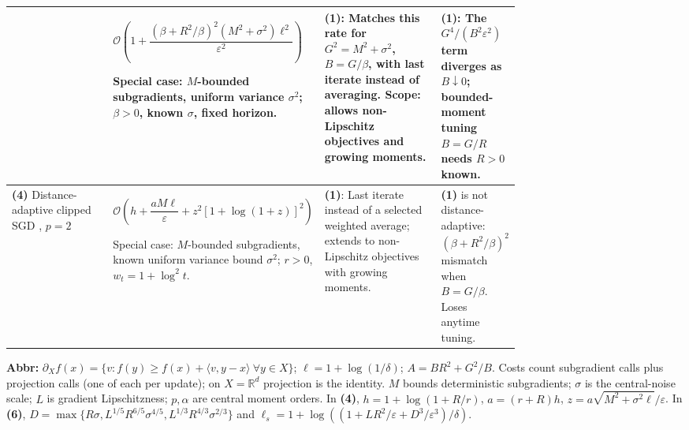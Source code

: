 \begin{table}[tp]
\begin{threeparttable}
\begin{tabularx}{\linewidth}{@{}>{\raggedright\arraybackslash}p{0.20\linewidth}>{\raggedright\arraybackslash}p{0.32\linewidth}>{\raggedright\arraybackslash}p{0.23\linewidth}>{\raggedright\arraybackslash}X@{}}
& $\mathcal{O}\!\left(1+\dfrac{(\beta+R^2/\beta)^2(M^2+\sigma^2)\ell^2}{\varepsilon^2}\right)$\par Special case: $M$-bounded subgradients, uniform variance $\sigma^2$; $\beta>0$, known $\sigma$, fixed horizon.
& \textbf{(1)}: Matches this rate for $G^2=M^2+\sigma^2$, $B=G/\beta$, with last iterate instead of averaging. Scope: allows non-Lipschitz objectives and growing moments.
& \textbf{(1)}: The $G^4/(B^2\varepsilon^2)$ term diverges as $B\downarrow0$; bounded-moment tuning $B=G/R$ needs $R>0$ known. \\
\midrule
\textbf{(4)} Distance-adaptive clipped SGD \citep[Thm.~6]{tcLZ2023v3}, $p=2$
& $\mathcal{O}\!\left(h+\dfrac{aM\ell}{\varepsilon}+z^2[1+\log(1+z)]^2\right)$\par Special case: $M$-bounded subgradients, known uniform variance bound $\sigma^2$; $r>0$, $w_t=1+\log^2t$.
& \textbf{(1)}: Last iterate instead of a selected weighted average; extends to non-Lipschitz objectives with growing moments.
& \textbf{(1)} is not distance-adaptive: $(\beta+R^2/\beta)^2$ mismatch when $B=G/\beta$. Loses anytime tuning. \\

\bottomrule
\end{tabularx}
\begin{tablenotes}[flushleft]\footnotesize
\item[] \textbf{Abbr:} $\partial_X f(x)=\{v:f(y)\ge f(x)+\langle v,y-x\rangle\ \forall y\in X\}$; $\ell=1+\log(1/\delta)$; $A=BR^2+G^2/B$. Costs count subgradient calls plus projection calls (one of each per update); on $X=\mathbb R^d$ projection is the identity. $M$ bounds deterministic subgradients; $\sigma$ is the central-noise scale; $L$ is gradient Lipschitzness; $p,\alpha$ are central moment orders. In \textbf{(4)}, $h=1+\log(1+R/r)$, $a=(r+R)h$, $z=a\sqrt{M^2+\sigma^2\ell}/\varepsilon$. In \textbf{(6)}, $D=\max\{R\sigma,L^{1/5}R^{6/5}\sigma^{4/5},L^{1/3}R^{4/3}\sigma^{2/3}\}$ and $\ell_s=1+\log((1+LR^2/\varepsilon+D^3/\varepsilon^3)/\delta)$.
\end{tablenotes}
\end{threeparttable}
\end{table}
\clearpage
